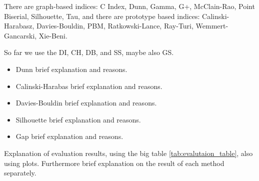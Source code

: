 There are graph-based indices: C Index, Dunn, Gamma, G+, McClain-Rao, Point Biserial, Silhouette, Tau, and there are prototype based indices: Calinski-Harabasz, Davies-Bouldin, PBM, Ratkowski-Lance, Ray-Turi, Wemmert-Gancarski, Xie-Beni.

So far we use the \gls{DI}, \gls{CH}, \gls{DB}, and \gls{SS}, maybe also \gls{GS}.

\begin{itemize}
    \item Dunn \cite{dunn1974well} brief explanation and reasons.
    \item Calinski-Harabas \cite{calinski1974dendrite} brief explanation and reasons.
    \item Davies-Bouldin \cite{davies1979cluster} brief explanation and reasons.
    \item Silhouette \cite{rousseeuw1987silhouettes} brief explanation and reasons.
    \item Gap \cite{tibshirani2001estimating} brief explanation and reasons.
\end{itemize}

Explanation of evaluation results, using the big table \ref{tab:evalutaion_table}, also using plots. Furthermore brief explanation on the result of each method separately. 

